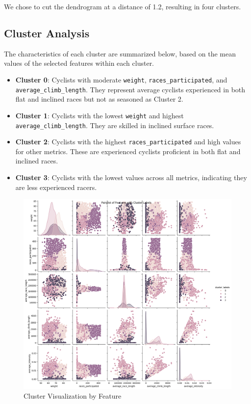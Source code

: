 \documentclass{article}
\begin{document}
We chose to cut the dendrogram at a distance of 1.2, resulting in four clusters.

\subsection{Cluster Analysis}

The characteristics of each cluster are summarized below, based on the mean values of the selected features within each cluster.

\begin{itemize}
    \item \textbf{Cluster 0}: Cyclists with moderate \texttt{weight}, \texttt{races\_participated}, and \texttt{average\_climb\_length}. They represent average cyclists experienced in both flat and inclined races but not as seasoned as Cluster 2.
    \item \textbf{Cluster 1}: Cyclists with the lowest \texttt{weight} and highest \texttt{average\_climb\_length}. They are skilled in inclined surface races.
    \item \textbf{Cluster 2}: Cyclists with the highest \texttt{races\_participated} and high values for other metrics. These are experienced cyclists proficient in both flat and inclined races.
    \item \textbf{Cluster 3}: Cyclists with the lowest values across all metrics, indicating they are less experienced racers.
\end{itemize}

\begin{figure}[H]
    \centering
    \includegraphics[width=0.8\linewidth]{dend_pair.png}
    \caption{Cluster Visualization by Feature}
    \label{fig:cluster_visualization}
\end{figure}
\end{document}
